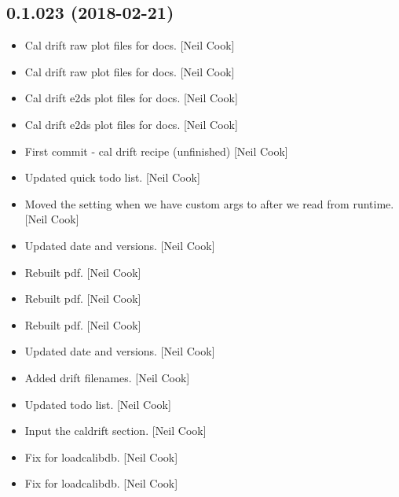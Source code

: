 \documentclass[a4paper,10pt,english]{report}
\begin{document}
\subsection{0.1.023 (2018-02-21)}
\label{\detokenize{misc/changelog:id481}}\begin{itemize}
\item {} 
Cal drift raw plot files for docs. {[}Neil Cook{]}

\item {} 
Cal drift raw plot files for docs. {[}Neil Cook{]}

\item {} 
Cal drift e2ds plot files for docs. {[}Neil Cook{]}

\item {} 
Cal drift e2ds plot files for docs. {[}Neil Cook{]}

\item {} 
First commit - cal drift recipe (unfinished) {[}Neil Cook{]}

\item {} 
Updated quick todo list. {[}Neil Cook{]}

\item {} 
Moved the  setting when we have custom args
to after we read from runtime. {[}Neil Cook{]}

\item {} 
Updated date and versions. {[}Neil Cook{]}

\item {} 
Rebuilt pdf. {[}Neil Cook{]}

\item {} 
Rebuilt pdf. {[}Neil Cook{]}

\item {} 
Rebuilt pdf. {[}Neil Cook{]}

\item {} 
Updated date and versions. {[}Neil Cook{]}

\item {} 
Added drift filenames. {[}Neil Cook{]}

\item {} 
Updated todo list. {[}Neil Cook{]}

\item {} 
Input the caldrift section. {[}Neil Cook{]}

\item {} 
Fix for loadcalibdb. {[}Neil Cook{]}

\item {} 
Fix for loadcalibdb. {[}Neil Cook{]}

\end{itemize}
\end{document}

